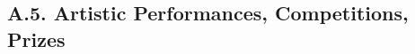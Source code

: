 \documentclass[10pt]{article}
\begin{document}





\subsection*{A.5. Artistic Performances, Competitions, Prizes}



\end{document}
